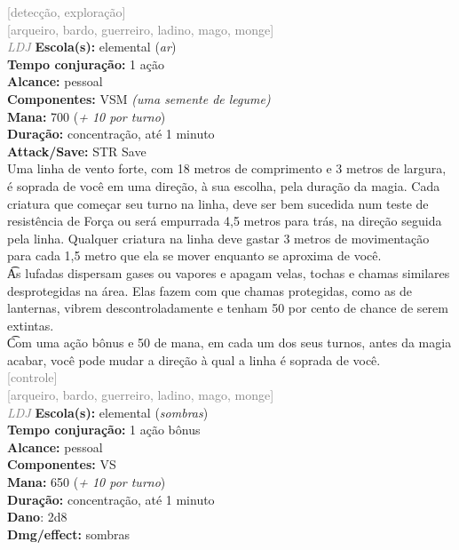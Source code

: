 \documentclass{RPG_Adventure}[2021/10/20]
\begin{document}
{\scriptsize \textcolor{gray}{[detecção, exploração]\\}}
{\scriptsize \textcolor{gray}{[arqueiro, bardo, guerreiro, ladino, mago, monge]\\}}
{\tiny \textcolor{gray}{\textit{LDJ}}}\jump{}
{\small \t \textbf{Escola(s):} elemental (\textit{ar})\\\t \textbf{Tempo conjuração:} 1 ação\\\t \textbf{Alcance:} pessoal\\\t \textbf{Componentes:} VSM \textit{(uma semente de legume)}\\\t \textbf{Mana:} 700 (\textit{+ 10 por turno})\\\t \textbf{Duração:} concentração, até 1 minuto\\\t \textbf{Attack/Save:} STR Save\\}
{\normalsize Uma linha de vento forte, com 18 metros de comprimento e 3 metros de largura, é soprada de você em uma direção, à sua escolha, pela duração da magia. Cada criatura que começar seu turno na linha, deve ser bem sucedida num teste de resistência de Força ou será empurrada 4,5 metros para trás, na direção seguida pela linha. Qualquer criatura na linha deve gastar 3 metros de movimentação para cada 1,5 metro que ela se mover enquanto se aproxima de você.\\\t As lufadas dispersam gases ou vapores e apagam velas, tochas e chamas similares desprotegidas na área. Elas fazem com que chamas protegidas, como as de lanternas, vibrem descontroladamente e tenham 50 por cento de chance de serem extintas.\\\t Com uma ação bônus e 50 de mana, em cada um dos seus turnos, antes da magia acabar, você pode mudar a direção à qual a linha é soprada de você.\\}
{\scriptsize \textcolor{gray}{[controle]\\}}
{\scriptsize \textcolor{gray}{[arqueiro, bardo, guerreiro, ladino, mago, monge]\\}}
{\tiny \textcolor{gray}{\textit{LDJ}}}\jump{}
{\small \t \textbf{Escola(s):} elemental (\textit{sombras})\\\t \textbf{Tempo conjuração:} 1 ação bônus\\\t \textbf{Alcance:} pessoal\\\t \textbf{Componentes:} VS\\\t \textbf{Mana:} 650 (\textit{+ 10 por turno})\\\t \textbf{Duração:} concentração, até 1 minuto\\\t \textbf{Dano}: 2d8\\\t \textbf{Dmg/effect:} sombras\\}
\end{document}
